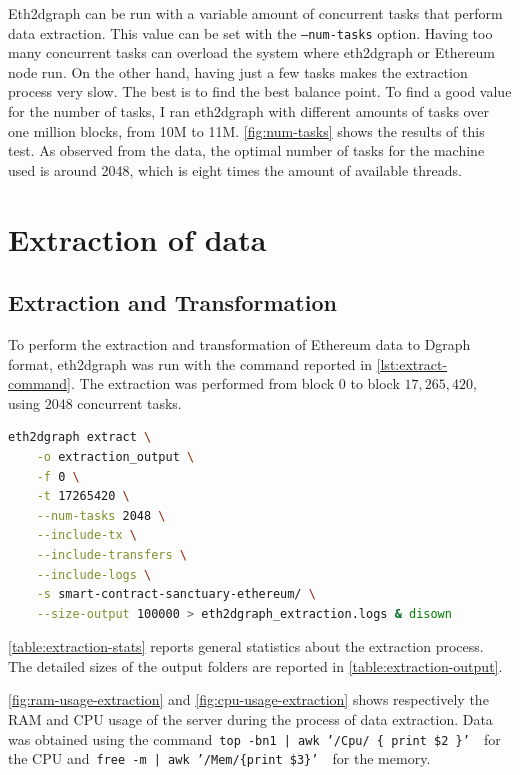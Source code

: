 Eth2dgraph can be run with a variable amount of concurrent tasks that perform data extraction. This value can be set with the {\tt --num-tasks} option. Having too many concurrent tasks can overload the system where eth2dgraph or Ethereum node run. On the other hand, having just a few tasks makes the extraction process very slow. The best is to find the best balance point.
To find a good value for the number of tasks, I ran eth2dgraph with different amounts of tasks over one million blocks, from 10M to 11M. \cref{fig:num-tasks} shows the results of this test. As observed from the data, the optimal number of tasks for the machine used is around 2048, which is eight times the amount of available threads.

\section{Extraction of data}

\subsection{Extraction and Transformation}

To perform the extraction and transformation of Ethereum data to Dgraph format, eth2dgraph was run with the command reported in \cref{lst:extract-command}. The extraction was performed from block $0$ to block $17,265,420$, using $2048$ concurrent tasks. 

\begin{lstlisting}[language=Bash,caption={Eth2dgraph extraction command used.},label={lst:extract-command},captionpos=b,numbers=none]
eth2dgraph extract \
    -o extraction_output \
    -f 0 \
    -t 17265420 \
    --num-tasks 2048 \
    --include-tx \
    --include-transfers \
    --include-logs \
    -s smart-contract-sanctuary-ethereum/ \
    --size-output 100000 > eth2dgraph_extraction.logs & disown
\end{lstlisting}

\cref{table:extraction-stats} reports general statistics about the extraction process. The detailed sizes of the output folders are reported in \cref{table:extraction-output}.

\cref{fig:ram-usage-extraction} and \cref{fig:cpu-usage-extraction} shows respectively the RAM and CPU usage of the server during the process of data extraction. Data was obtained using the command~{\tt top -bn1 | awk '/Cpu/ \{ print \$2 \}' }~for the CPU and~{\tt free -m | awk '/Mem/\{print \$3\}' }~for the memory.
  

